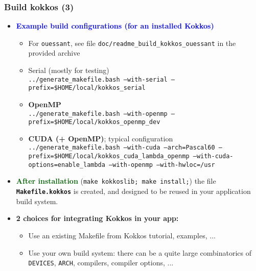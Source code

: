 \begin{frame}
  \frametitle{Build kokkos (3)}

  \begin{itemize}
  \item \textcolor{blue}{\textbf{Example build configurations (for an installed Kokkos)}}
    \begin{itemize}
    \item For \texttt{ouessant}, see file \texttt{doc/readme\_build\_kokkos\_ouessant} in the provided archive
    \item Serial (mostly for testing)\\
      \texttt{../generate\_makefile.bash --with-serial --prefix=\$HOME/local/kokkos\_serial}
    \item \textbf{OpenMP}\\
      \texttt{../generate\_makefile.bash --with-openmp --prefix=\$HOME/local/kokkos\_openmp\_dev}
    \item \textbf{CUDA (+ OpenMP)}; typical configuration\\
      \texttt{../generate\_makefile.bash --with-cuda --arch=Pascal60 --prefix=\$HOME/local/kokkos\_cuda\_lambda\_openmp --with-cuda-options=enable\_lambda --with-openmp --with-hwloc=/usr}
    \end{itemize}
  \item \textcolor{darkgreen}{\textbf{After installation}} (\texttt{make kokkoslib; make install;}) the file \textbf{\texttt{Makefile.kokkos}} is created, and designed to be reused in your application build system.
  \item \textbf{2 choices for integrating Kokkos in your app:}
    \begin{itemize}
    \item Use an existing Makefile from Kokkos tutorial, examples, ...
    \item Use your own build system: there can be a quite large combinatorics of \texttt{DEVICES}, \texttt{ARCH}, compilers, compiler options, ...
    \end{itemize}
  \end{itemize}
  
\end{frame}

